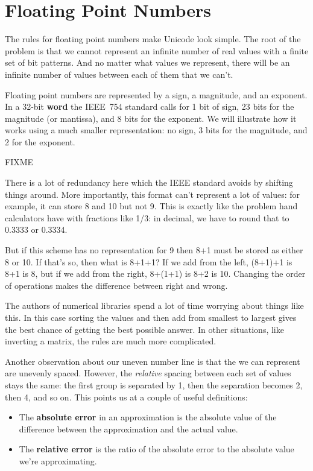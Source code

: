 \documentclass{scrbook}
\newcommand{\glossref}[1]{\textbf{#1}}
\begin{document}
\section{Floating Point Numbers}\label{binary-fp}


The rules for floating point numbers make Unicode look simple.
The root of the problem is that
we cannot represent an infinite number of real values
with a finite set of bit patterns.
And no matter what values we represent,
there will be an infinite number of values between each of them that we can't.



Floating point numbers are represented by a sign,
a magnitude,
and an exponent.
In a 32-bit \glossref{word}
the IEEE 754 standard calls for 1 bit of sign,
23 bits for the magnitude (or mantissa),
and 8 bits for the exponent.
We will illustrate how it works using a much smaller representation:
no sign,
3 bits for the magnitude,
and 2 for the exponent.


FIXME


There is a lot of redundancy here
which the IEEE standard avoids by shifting things around.
More importantly,
this format can't represent a lot of values:
for example,
it can store 8 and 10 but not 9.
This is exactly like the problem hand calculators have
with fractions like 1/3:
in decimal, we have to round that to 0.3333 or 0.3334.


But if this scheme has no representation for 9
then 8+1 must be stored as either 8 or 10.
If that's so,
then what is 8+1+1?
If we add from the left,
(8+1)+1 is 8+1 is 8,
but if we add from the right,
8+(1+1) is 8+2 is 10.
Changing the order of operations makes the difference between right and wrong.


The authors of numerical libraries spend a lot of time worrying about things like this.
In this case
sorting the values and then add from smallest to largest
gives the best chance of getting the best possible answer.
In other situations,
like inverting a matrix, the rules are much more complicated.


Another observation about our uneven number line is that
the we can represent are unevenly spaced.
However,
the \emph{relative} spacing between each set of values stays the same:
the first group is separated by 1,
then the separation becomes 2,
then 4,
and so on.
This points us at a couple of useful definitions:

\begin{itemize}

\item 

The \glossref{absolute error} in an approximation
    is the absolute value of the difference
    between the approximation and the actual value.



\item 

The \glossref{relative error}
    is the ratio of the absolute error
    to the absolute value we're approximating.



\end{itemize}
\end{document}
